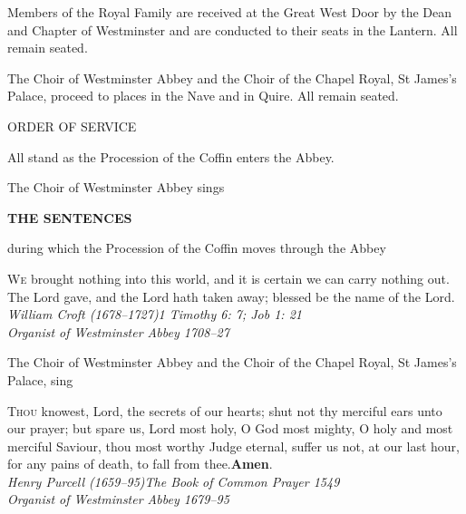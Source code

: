 


Members of the Royal Family are received at the Great West Door by the Dean and Chapter of
Westminster and are conducted to their seats in the Lantern. All remain seated.


The Choir of Westminster Abbey and the Choir of the Chapel Royal, St James’s Palace, proceed to
places in the Nave and in Quire. All remain seated.\begin{center}
\normalfont\color{black}\LARGE{} ORDER OF SERVICE
\end{center}

All stand as the Procession of the Coffin enters the Abbey.



The Choir of Westminster Abbey sings
\begin{center}\normalfont\bfseries
THE SENTENCES
\end{center}
during which the Procession of the Coffin moves through the Abbey



\color{black}\normalfont \lettrine[lines=2,loversize=.2]{W}{e} brought nothing into this world, and it is certain we can carry nothing out.\\The Lord gave, and the Lord hath taken away; blessed be the name of the Lord.\color{qred}\itshape\\
William Croft (1678–1727)\hfill 1 Timothy 6: 7; Job 1: 21\\
Organist of Westminster Abbey 1708–27



The Choir of Westminster Abbey and the Choir of the Chapel Royal, St James’s Palace, sing

\color{black}\normalfont \lettrine[lines=2,loversize=.2]{T}{hou} knowest, Lord, the secrets of our hearts; shut not thy merciful ears unto our
prayer; but spare us, Lord most holy, O God most mighty, O holy and most
merciful Saviour, thou most worthy Judge eternal, suffer us not, at our last hour, for
any pains of death, to fall from thee.\textbf{Amen}.\\\itshape\color{qred}
Henry Purcell (1659–95)\hfill The Book of Common Prayer 1549\\
Organist of Westminster Abbey 1679–95


